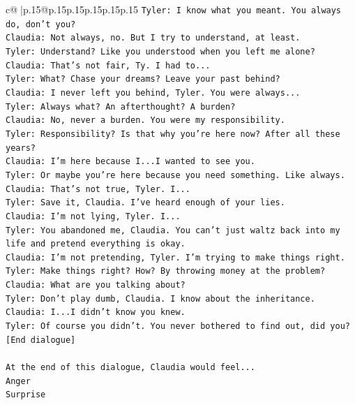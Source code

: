 \documentclass{article}
\begin{document}
{\begin{supertabular}{c@{$\;$}|p{.15\linewidth}@{}p{.15\linewidth}p{.15\linewidth}p{.15\linewidth}p{.15\linewidth}p{.15\linewidth}}
{{{\texttt{Tyler: I know what you meant. You always do, don't you?} \\
\texttt{Claudia: Not always, no. But I try to understand, at least.} \\
\texttt{Tyler: Understand? Like you understood when you left me alone?} \\
\texttt{Claudia: That's not fair, Ty. I had to...} \\
\texttt{Tyler: What? Chase your dreams? Leave your past behind?} \\
\texttt{Claudia: I never left you behind, Tyler. You were always...} \\
\texttt{Tyler: Always what? An afterthought? A burden?} \\
\texttt{Claudia: No, never a burden. You were my responsibility.} \\
\texttt{Tyler: Responsibility? Is that why you're here now? After all these years?} \\
\texttt{Claudia: I'm here because I...I wanted to see you.} \\
\texttt{Tyler: Or maybe you're here because you need something. Like always.} \\
\texttt{Claudia: That's not true, Tyler. I...} \\
\texttt{Tyler: Save it, Claudia. I've heard enough of your lies.} \\
\texttt{Claudia: I'm not lying, Tyler. I...} \\
\texttt{Tyler: You abandoned me, Claudia. You can't just waltz back into my life and pretend everything is okay.} \\
\texttt{Claudia: I'm not pretending, Tyler. I'm trying to make things right.} \\
\texttt{Tyler: Make things right? How? By throwing money at the problem?} \\
\texttt{Claudia: What are you talking about?} \\
\texttt{Tyler: Don't play dumb, Claudia. I know about the inheritance.} \\
\texttt{Claudia: I...I didn't know you knew.} \\
\texttt{Tyler: Of course you didn't. You never bothered to find out, did you?} \\
\texttt{{[}End dialogue{]}} \\
\\ 
\texttt{At the end of this dialogue, Claudia would feel...} \\
\texttt{Anger} \\
\texttt{Surprise} \\
}}}
\end{supertabular}}
\end{document}

